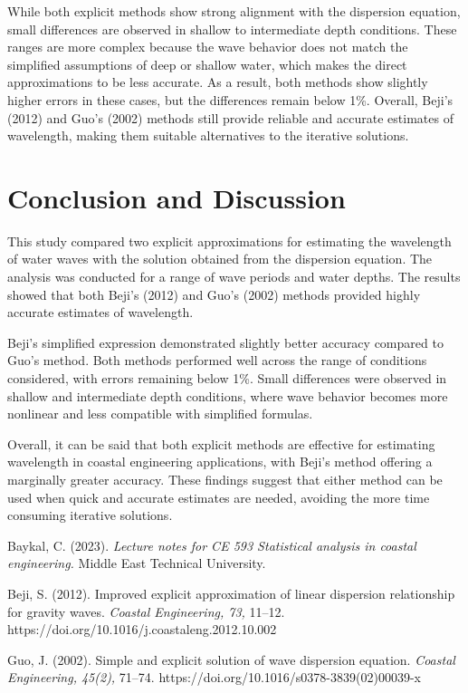 \documentclass[a4paper, 11pt]{article}
\begin{document}
While both explicit methods show strong alignment with the dispersion equation, small differences are observed in shallow to intermediate depth conditions. These ranges are more complex because the wave behavior does not match the simplified assumptions of deep or shallow water, which makes the direct approximations to be less accurate. As a result, both methods show slightly higher errors in these cases, but the differences remain below 1\%. Overall, Beji’s (2012) and Guo’s (2002) methods still provide reliable and accurate estimates of wavelength, making them suitable alternatives to the iterative solutions.

\section{Conclusion and Discussion}

\hspace{0.5cm}This study compared two explicit approximations for estimating the wavelength of water waves with the solution obtained from the dispersion equation. The analysis was conducted for a range of wave periods and water depths. The results showed that both Beji's (2012) and Guo's (2002) methods provided highly accurate estimates of wavelength. 

Beji's simplified expression demonstrated slightly better accuracy compared to Guo's method. Both methods performed well across the range of conditions considered, with errors remaining below 1\%. Small differences were observed in shallow and intermediate depth conditions, where wave behavior becomes more nonlinear and less compatible with simplified formulas.

Overall, it can be said that both explicit methods are effective for estimating wavelength in coastal engineering applications, with Beji's method offering a marginally greater accuracy. These findings suggest that either method can be used when quick and accurate estimates are needed, avoiding the more time consuming iterative solutions.
\newpage

\begin{thebibliography}{99}

Baykal, C. (2023). \textit{Lecture notes for CE 593 Statistical analysis in coastal engineering.} Middle East Technical University.

 Beji, S. (2012). Improved explicit approximation of linear dispersion relationship for gravity waves. \textit{Coastal Engineering, 73,} 11–12. https://doi.org/10.1016/j.coastaleng.2012.10.002

 Guo, J. (2002). Simple and explicit solution of wave dispersion equation. \textit{Coastal Engineering, 45(2),} 71–74. https://doi.org/10.1016/s0378-3839(02)00039-x


\end{thebibliography}
\newpage
\end{document}
